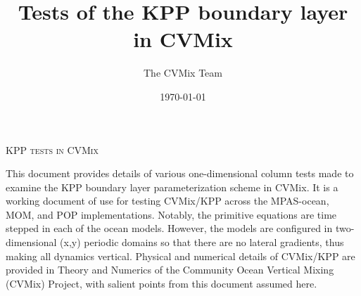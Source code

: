 \documentclass[fleqn,10pt]{book}
\title{\sc Tests of the KPP boundary layer in CVMix}
\date{\today}
\author[$\star$]{The CVMix Team}
\begin{document}
\maketitle 
\thispagestyle{empty}


\begin{center}
{\scshape \Large KPP tests in CVMix} 
\end{center}

This document provides details of various one-dimensional column tests
made to examine the KPP \citep{LargeKPP} boundary layer
parameterization scheme in CVMix.  It is a working document of use for
testing CVMix/KPP across the MPAS-ocean, MOM, and POP implementations.
Notably, the primitive equations are time stepped in each of the ocean
models.  However, the models are configured in two-dimensional (x,y)
periodic domains so that there are no lateral gradients, thus making
all dynamics vertical.  Physical and numerical details of CVMix/KPP
are provided in {\sc Theory and Numerics of the Community Ocean
  Vertical Mixing (CVMix) Project}, with salient points from this
document assumed here.


\dominitoc
\tableofcontents
\listoffigures






\newpage 


\gdef\rightmark{\scshape BIBLIOGRAPHY}

\end{document}
